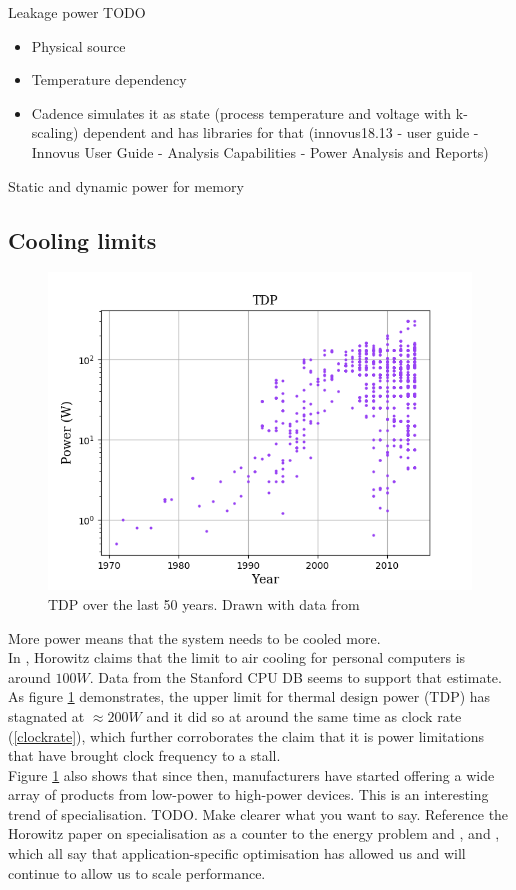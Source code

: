 \documentclass[12pt,a4paper]{article}
\newcommand{\note}{\textcolor{WildStrawberry}}
\begin{document}
Leakage power \note{TODO}\\ 
\begin{itemize}
	\item Physical source
	\item Temperature dependency
	\item Cadence simulates it as state (process temperature and voltage with k-scaling) dependent and has libraries for that (innovus18.13 - user guide - Innovus User Guide - Analysis Capabilities - Power Analysis and Reports)
\end{itemize}

\note{Static and dynamic power for memory}

\subsection{Cooling limits}
\begin{figure}[!h]
	\centering
	\includegraphics[width=\textwidth]{Source/TDP.png}
	\caption{TDP over the last 50 years. Drawn with data from \cite{cpudb}} 
	\label{tdp}
\end{figure}%
More power means that the system needs to be cooled more. \\
In \cite{ComputingsEnergyProblem}, Horowitz claims that the limit to air cooling for personal computers is around $100W$. Data from the Stanford CPU DB seems to support that estimate. As figure \ref{tdp} demonstrates, the upper limit for thermal design power (TDP) has stagnated at $\approx 200W$ and it did so at around the same time as clock rate (\ref{clockrate}), which further corroborates the claim that it is power limitations that have brought clock frequency to a stall.\\
Figure \ref{tdp} also shows that since then, manufacturers have started offering a wide array of products from low-power to high-power devices. This is an interesting trend of specialisation. \note{TODO. Make clearer what you want to say. Reference the Horowitz paper on specialisation as a counter to the energy problem \cite{ComputingsEnergyProblem} and \cite{ApplicationDependentScaling}, \cite{MaintainingBenefitsWhenScalingBogsDown} and \cite{PowerConstrainedCMOSScalingLimits}, which all say that application-specific optimisation has allowed us and will continue to allow us to scale performance.}
\end{document}
